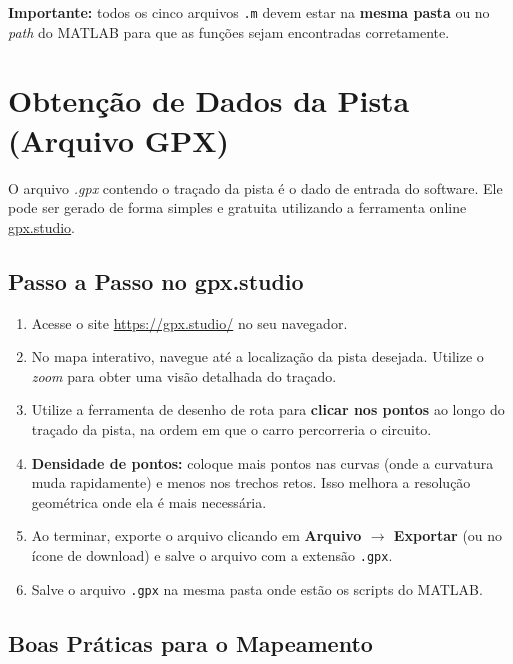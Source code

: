 \documentclass[a4paper,12pt]{article}
\begin{document}
\textbf{Importante:} todos os cinco arquivos \texttt{.m} devem estar na \textbf{mesma pasta} ou no \textit{path} do MATLAB para que as funções sejam encontradas corretamente.


\section{Obtenção de Dados da Pista (Arquivo GPX)}

O arquivo \textit{.gpx} contendo o traçado da pista é o dado de entrada do software. Ele pode ser gerado de forma simples e gratuita utilizando a ferramenta online \href{https://gpx.studio/}{gpx.studio}.

\subsection{Passo a Passo no gpx.studio}

\begin{enumerate}
    \item Acesse o site \url{https://gpx.studio/} no seu navegador.
    \item No mapa interativo, navegue até a localização da pista desejada. Utilize o \textit{zoom} para obter uma visão detalhada do traçado.
    \item Utilize a ferramenta de desenho de rota para \textbf{clicar nos pontos} ao longo do traçado da pista, na ordem em que o carro percorreria o circuito.
    \item \textbf{Densidade de pontos:} coloque mais pontos nas curvas (onde a curvatura muda rapidamente) e menos nos trechos retos. Isso melhora a resolução geométrica onde ela é mais necessária.
    \item Ao terminar, exporte o arquivo clicando em \textbf{Arquivo $\rightarrow$ Exportar} (ou no ícone de download) e salve o arquivo com a extensão \texttt{.gpx}.
    \item Salve o arquivo \texttt{.gpx} na mesma pasta onde estão os scripts do MATLAB.
\end{enumerate}

\subsection{Boas Práticas para o Mapeamento}
\end{document}
